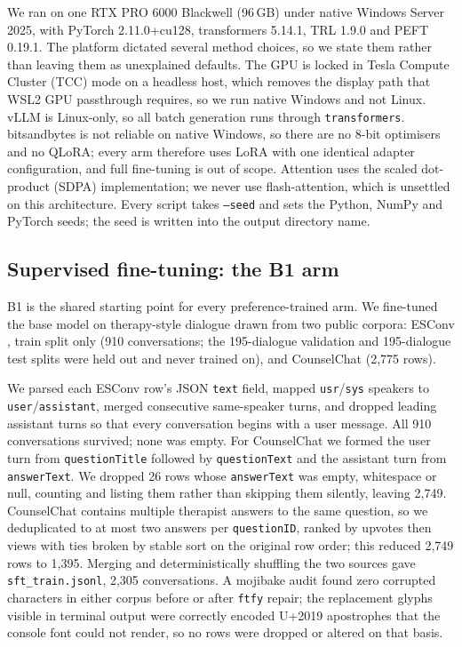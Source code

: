 We ran on one RTX PRO 6000 Blackwell (96\,GB) under native Windows Server 2025, with
PyTorch 2.11.0+cu128, transformers 5.14.1, TRL 1.9.0 and PEFT 0.19.1. The platform
dictated several method choices, so we state them rather than leaving them as unexplained
defaults. The GPU is locked in Tesla Compute Cluster (TCC) mode on a headless host, which
removes the display path that WSL2 GPU passthrough requires, so we run native Windows and
not Linux. vLLM is Linux-only, so all batch generation runs through
\texttt{transformers}. bitsandbytes is not reliable on native Windows, so there are no
8-bit optimisers and no QLoRA; every arm therefore uses LoRA with one identical adapter
configuration, and full fine-tuning is out of scope. Attention uses the scaled dot-product
(SDPA) implementation; we never use flash-attention, which is unsettled on this
architecture. Every script takes \texttt{--seed} and sets the Python, NumPy and PyTorch
seeds; the seed is written into the output directory name.

\subsection{Supervised fine-tuning: the B1 arm}
\label{sec:methods:sft}

B1 is the shared starting point for every preference-trained arm. We fine-tuned the
base model on therapy-style dialogue drawn from two public corpora: ESConv
\citep{liu2021esconv}, train split only (910 conversations; the 195-dialogue validation
and 195-dialogue test splits were held out and never trained on), and CounselChat
\citep{bertagnolli2020counselchat} (2{,}775 rows).

We parsed each ESConv row's JSON \texttt{text} field, mapped \texttt{usr}/\texttt{sys}
speakers to \texttt{user}/\texttt{assistant}, merged consecutive same-speaker turns, and
dropped leading assistant turns so that every conversation begins with a user message.
All 910 conversations survived; none was empty. For CounselChat we formed the user turn
from \texttt{questionTitle} followed by \texttt{questionText} and the assistant turn from
\texttt{answerText}. We dropped 26 rows whose \texttt{answerText} was empty, whitespace
or null, counting and listing them rather than skipping them silently, leaving 2{,}749.
CounselChat contains multiple therapist answers to the same question, so we deduplicated
to at most two answers per \texttt{questionID}, ranked by upvotes then views with ties
broken by stable sort on the original row order; this reduced 2{,}749 rows to 1{,}395.
Merging and deterministically shuffling the two sources gave
\texttt{sft\_train.jsonl}, 2{,}305 conversations. A mojibake audit found zero corrupted
characters in either corpus before or after \texttt{ftfy} repair; the replacement glyphs
visible in terminal output were correctly encoded U+2019 apostrophes that the console
font could not render, so no rows were dropped or altered on that basis.

